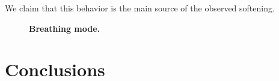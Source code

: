 We claim that this behavior is the main source of the observed softening.


\begin{figure}
	\caption{{\bf Breathing mode.} \label{fig:BTO_breathing}}
\end{figure}
\begin{figure}
	\caption{\label{fig:BTO_theory}}
\end{figure}

\section{Conclusions}


\printbibliography
